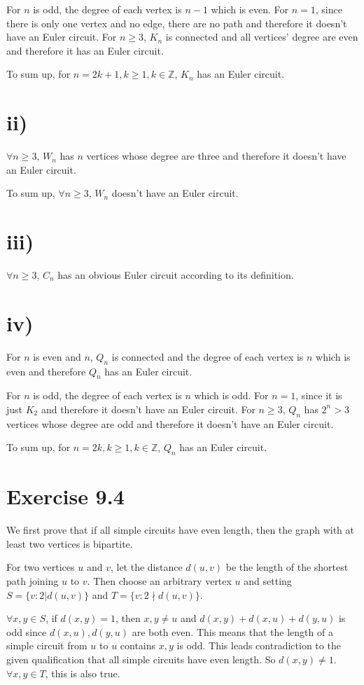\documentclass[a4paper,12pt,titlepage]{article}
\begin{document}
For $n$ is odd, the degree of each vertex is $n-1$ which is even. For $n=1$, since there is only one vertex and no edge, there are no path and therefore it doesn't have an Euler circuit.  For $n\geqslant3$, $K_n$ is connected and all vertices' degree are even  and therefore it has an Euler circuit. 

To sum up, for $n=2k+1,k\geqslant1,k\in\mathbb{Z}$, $K_n$ has an Euler circuit.

\section*{ii)}
$\forall n\geqslant3$, $W_n$ has $n$ vertices whose degree are three and therefore it doesn't have an Euler circuit.

To sum up, $\forall n\geqslant3$, $W_n$ doesn't have an Euler circuit.
\section*{iii)}
$\forall n\geqslant3$, $C_n$ has an obvious Euler circuit according to its definition.
\section*{iv)}
For $n$ is even and $n$, $Q_n$ is connected and the degree of each vertex is $n$ which is even and therefore $Q_n$ has an Euler circuit.

For $n$ is odd, the degree of each vertex is $n$ which is odd. For $n=1$, since it is just $K_2$ and therefore it doesn't have an Euler circuit. For $n\geqslant3$, $Q_n$ has $2^n>3$ vertices whose degree are odd and therefore it doesn't have an Euler circuit. 

To sum up, for $n=2k,k\geqslant1,k\in\mathbb{Z}$, $Q_n$ has an Euler circuit.
\section*{Exercise 9.4}
We first prove that if all simple circuits have even length, then the graph with at least two vertices is bipartite.

For two vertices $u$ and $v$, let the distance $d(u, v)$ be the length of the shortest path joining $u$ to $v$. Then choose an arbitrary vertex $u$ and setting $S = \lbrace v : 2 | d(u, v)\rbrace$ and $T =\lbrace v : 2 \nmid d(u, v)\rbrace$.

$\forall x,y\in S$, if $d(x,y)=1$, then $x,y\neq u$ and  $d(x,y)+d(x,u)+d(y,u)$ is odd since $d(x,u),d(y,u)$ are both even. This means that the length of a simple circuit from $u$ to $u$ contains $x,y$ is odd. This leads contradiction to the given qualification that all simple circuits have even length. So $d(x,y)\neq1$. $\forall x,y\in T$, this is also true.
\end{document}
